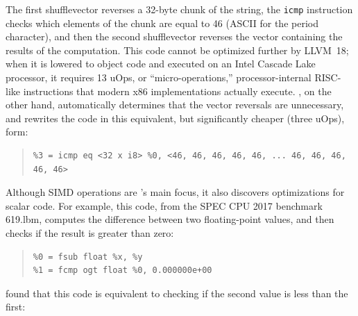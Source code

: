 
The first shufflevector reverses a 32-byte chunk of the string, the
\texttt{icmp} instruction checks which elements of the chunk are equal
to 46 (ASCII for the period character), and then the second
shufflevector reverses the vector containing the results of the
computation.
%
This code cannot be optimized further by LLVM~18; when it is lowered to
object code and executed on an Intel Cascade Lake processor, it
requires 13 uOps, or ``micro-operations,'' processor-internal
RISC-like instructions that modern x86 implementations actually
execute.
%
\minotaur{}, on the other hand, automatically determines that the vector
reversals are unnecessary, and rewrites the code in this equivalent,
but significantly cheaper (three uOps), form:

{\begin{quote}
\begin{verbatim}
%3 = icmp eq <32 x i8> %0, <46, 46, 46, 46, 46, ... 46, 46, 46, 46, 46>
\end{verbatim}
\end{quote}}



Although SIMD operations are \minotaur's main focus, it also discovers
optimizations for scalar code.
%
For example, this code, from the SPEC CPU 2017 benchmark 619.lbm,
computes the difference between two floating-point values, and then
checks if the result is greater than zero:

{\begin{quote}\begin{verbatim}
%0 = fsub float %x, %y
%1 = fcmp ogt float %0, 0.000000e+00
\end{verbatim}
\end{quote}}

\minotaur{} found that this code is equivalent to checking if the second
value is less than the first:

